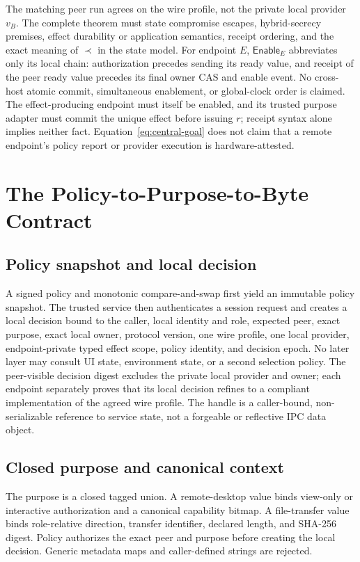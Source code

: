 \documentclass[journal]{IEEEtran}
\begin{document}
The matching peer run agrees on the wire profile, not the private local provider
$v_B$. The complete theorem must state compromise escapes, hybrid-secrecy
premises, effect durability or application semantics, receipt ordering, and the
exact meaning of $\prec$ in the state model. For endpoint $E$, $\mathsf{Enable}_E$
abbreviates only its local chain: authorization precedes sending its ready value,
and receipt of the peer ready value precedes its final owner CAS and enable event.
No cross-host atomic commit, simultaneous enablement, or global-clock order is
claimed. The effect-producing endpoint must itself be enabled, and its trusted
purpose adapter must commit the unique effect before issuing $r$; receipt syntax
alone implies neither fact.
Equation~\eqref{eq:central-goal} does not claim that a remote endpoint's policy
report or provider execution is hardware-attested.

\section{The Policy-to-Purpose-to-Byte Contract}

\subsection{Policy snapshot and local decision}
A signed policy and monotonic compare-and-swap first yield an immutable policy
snapshot. The trusted service then authenticates a session request and creates a
local decision bound to the caller, local identity and role, expected peer,
exact purpose, exact local owner, protocol version, one wire profile, one local
provider, endpoint-private typed effect scope, policy identity, and decision epoch. No later layer may consult UI
state, environment state, or a second selection policy. The peer-visible decision digest excludes the private
local provider and owner; each endpoint separately proves that its local
decision refines to a compliant implementation of the agreed wire profile. The
handle is a caller-bound, non-serializable reference to service state, not a
forgeable or reflective IPC data object.

\subsection{Closed purpose and canonical context}
The purpose is a closed tagged union. A remote-desktop value binds view-only or
interactive authorization and a canonical capability bitmap. A file-transfer
value binds role-relative direction, transfer identifier, declared length, and
SHA-256 digest. Policy authorizes the exact peer and purpose before creating the
local decision. Generic metadata maps and caller-defined strings are rejected.
\end{document}
